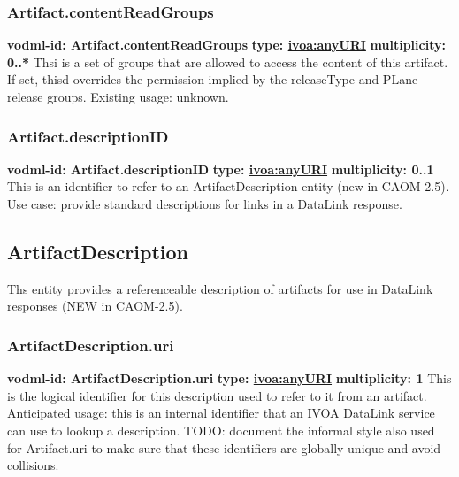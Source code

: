     \subsubsection{Artifact.contentReadGroups}
      \textbf{vodml-id: Artifact.contentReadGroups} \newline
      \textbf{type: \hyperref[sect:ivoa]{ivoa:anyURI}} \newline
      \textbf{multiplicity: 0..*} \newline
      Thsi is a set of groups that are allowed to access the content of this artifact. If set, thisd overrides the permission implied by the releaseType and PLane release groups. Existing usage: unknown.

    \subsubsection{Artifact.descriptionID}
      \textbf{vodml-id: Artifact.descriptionID} \newline
      \textbf{type: \hyperref[sect:ivoa]{ivoa:anyURI}} \newline
      \textbf{multiplicity: 0..1} \newline
      This is an identifier to refer to an ArtifactDescription entity (new in CAOM-2.5). Use case: provide standard descriptions for links in a DataLink response.

  \subsection{ArtifactDescription}
  \label{sect:ArtifactDescription}
    Ths entity provides a referenceable description of artifacts for use in DataLink responses (NEW in CAOM-2.5).

    \subsubsection{ArtifactDescription.uri}
      \textbf{vodml-id: ArtifactDescription.uri} \newline
      \textbf{type: \hyperref[sect:ivoa]{ivoa:anyURI}} \newline
      \textbf{multiplicity: 1} \newline
      This is the logical identifier for this description used to refer to it from an artifact. Anticipated usage: this is an internal identifier that an IVOA DataLink service can use to lookup a description. TODO: document the informal style also used for Artifact.uri to make sure that these identifiers are globally unique and avoid collisions.

